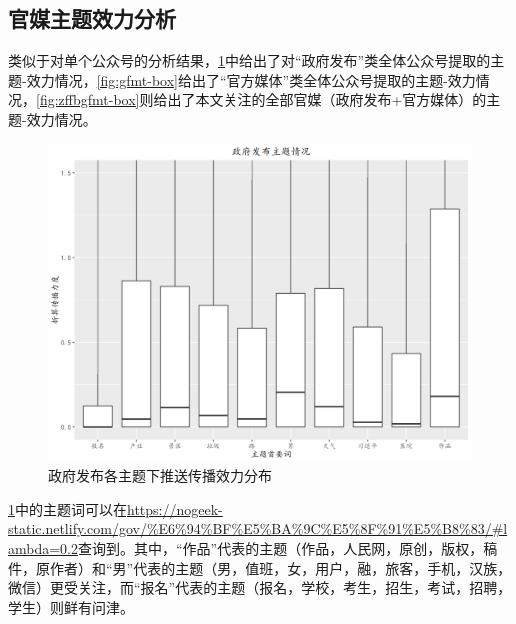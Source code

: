 \documentclass[a4paper,12pt,UTF8]{article}
\begin{document}
    \subsection{官媒主题效力分析}
    类似于对单个公众号的分析结果，\cref{fig:zffb-box}中给出了对“政府发布”类全体公众号提取的主题-效力情况，\cref{fig:gfmt-box}给出了“官方媒体”类全体公众号提取的主题-效力情况，\cref{fig:zffbgfmt-box}则给出了本文关注的全部官媒（政府发布+官方媒体）的主题-效力情况。
    \begin{figure}[htbp]
      \centering
      \includegraphics[width=0.9\linewidth]{政府发布.png}
      \caption{政府发布各主题下推送传播效力分布}
      \label{fig:zffb-box}
    \end{figure}
    \cref{fig:zffb-box}中的主题词可以在\url{https://nogeek-static.netlify.com/gov/%E6%94%BF%E5%BA%9C%E5%8F%91%E5%B8%83/#lambda=0.2}查询到。其中，“作品”代表的主题（作品，人民网，原创，版权，稿件，原作者）和“男”代表的主题（男，值班，女，用户，融，旅客，手机，汉族，微信）更受关注，而“报名”代表的主题（报名，学校，考生，招生，考试，招聘，学生）则鲜有问津。
\end{document}
